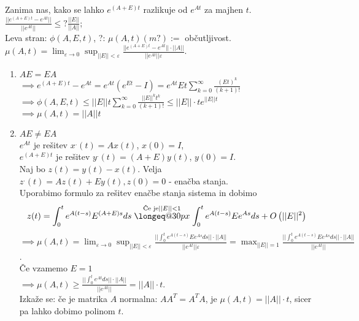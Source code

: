 \documentclass[a4paper, 12pt]{book}
\makeatletter
\theoremstyle{definition}
\theoremstyle{remark}
\newcommand{\longeq}[1]{\mathrel{\mathpalette\longeq@{#1}}}
\newcommand{\longeq@}[2]{%
  \begingroup
  \sbox\z@{$\m@th#1=$}%
  \ifdim#2<\wd\z@
    \resizebox{#2}{\height}{\box\z@}%
  \else
    \ifdim#2<3\wd\z@
      \hbox to #2{$\m@th#1=\hss=\hss=\hss=$}%
    \else
      \hbox to #2{$\m@th#1=\cleaders\hbox to 0.2\wd\z@{\hss$#1=$\hss}\hfil=$}%
    \fi
  \fi
  \endgroup
}
\makeatother
\begin{document}
Zanima nas, kako se lahko $e^{(A+E)t}$ razlikuje od $e^{At}$ za majhen $t$. \\
$\frac{|| e^{(A+E)t} - e^{At}||}{||e^{At}||} \leq ? \frac{||E||}{||A||}$; \\
Leva stran: $\phi(A, E, t)$, ?: $\mu(A, t) (m?) :=$ občutljivost. \\
$\mu(A, t) = \lim_{\varepsilon \to 0} \sup_{||E|| < \varepsilon}
    \frac{|| e^{(A+E)t} - e^{At}|| \cdot ||A||}{||e^{At}|| \varepsilon}$.
\begin{enumerate}[label=\alph*)]
    \item $AE = EA$ \\
        $\implies e^{(A+E)t} - e^{At} = e^{At} (e^{Et} - I) = e^{At} E t \sum_{k=0}^{\infty} \frac{(Et)^k}{(k+1)!}$ \\
        $\implies \phi(A, E, t) \leq ||E|| t \sum_{k=0}^{\infty} \frac{||E||^k t^k}{(k+1)!} \leq ||E|| \cdot t e^{||E|| t}$ \\
        $\implies \mu(A, t) = ||A|| t$
    \item $AE \neq EA$ \\
        $e^{At}$ je rešitev $x^{.}(t) = Ax(t)$, $x(0) = I$, \\
        $e^{(A+E)t}$ je rešitev $y^{.}(t) = (A+E)y(t)$, $y(0) = I$. \\
        Naj bo $z(t) = y(t) - x(t)$.
        Velja \\
        $z^{.}(t) = Az(t) + Ey(t), z(0) = 0$ - enačba stanja. \\
        Uporabimo formulo za rešitev enačbe stanja sistema in dobimo
        \begin{equation*}
            z(t) = \int_0^t e^{A(t-s)} E^{(A+E)s} ds \stackrel{\text{Če je} ||E|| < 1}{\longeq{30px}}
            \int_0^t e^{A(t-s)} E e^{As} ds + O \left( ||E||^2 \right)
        \end{equation*}
        $\implies \mu(A, t) = \lim_{\varepsilon \to 0} \sup_{||E|| < \varepsilon}
        \frac{|| \int_0^t e^{A(t-s)} E e^{As} ds || \cdot ||A||}{|| e^{At} || \varepsilon}
        = \max_{||E|| = 1} \frac{|| \int_0^t e^{A(t-s)} E e^{As} ds || \cdot ||A||}{|| e^{At} ||}$. \\
        Če vzamemo $E = 1$ \\
        $\implies \mu(A, t) \geq \frac{|| \int_0^t e^{At} ds || \cdot ||A||}{|| e^{At} ||} = ||A|| \cdot t$. \\
        Izkaže se: če je matrika $A$ normalna: $A A^T = A^T A$, je $\mu(A, t) = ||A|| \cdot t$,
        sicer pa lahko dobimo polinom $t$.
\end{enumerate}
\end{document}
